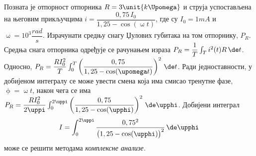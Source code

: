 \PID \mnAdvanced \label{z:snaga_complex}
Позната је  отпорност отпорника $R = 3\unit{k\Upomega}$ и струја
успостављена на његовим прикључцима
$i = \dfrac{0,75\,I_0}{1,25 - \cos(\upomega t)}$,
где су $I_0 = 1\unit{mA}$ и $\upomega 
= 10^3\unit{\dfrac{rad}{s}}$. Израчунати средњу снагу Џулових губитака на том отпорнику, $P_R$.
\\[2mm]

\RESENJE 
Средња снага отпорника одређује се рачунањем израза
$P_R = \dfrac{1}{T}\int_{T} i^2(t) R \, \de t$. Односно,
$P_R = \dfrac{R I_0^2}{T}\int_0^T 
\left(
\dfrac{0,75}{1,25 - \cos(\upomega t)}
\right)^2
 \, \de t$. Ради једноставности, у добијеном интегралу
 се може увести смена која има смисао 
 тренутне фазе, $\upphi = \upomega t$, након чега 
се има
$P_R = \dfrac{R I_0^2}{2\uppi }\int_0^{2\uppi} 
\left(
\dfrac{0,75}{1,25 - \cos(\upphi)}
\right)^2
 \, \de \upphi$. Добијени интеграл 
\begin{equation}
I = \int_0^{2\uppi} 
\frac{0,75^2}{
\bigl(1,25 - \cos(\upphi)\bigr)^2
}
 \, \de \upphi \label{1}
\end{equation} 
 може се решити 
методама \textit{комплексне анализе.}

